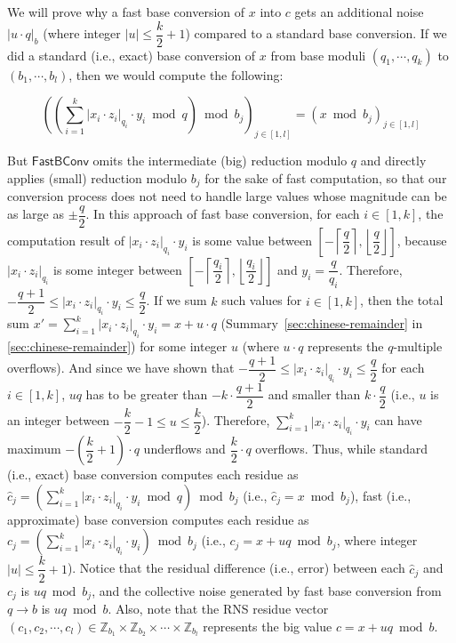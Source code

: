 \begin{myproof}

We will prove why a fast base conversion of $x$ into $c$ gets an additional noise $|u\cdot q|_b$ (where integer $|u| \leq \dfrac{k}{2}+1$) compared to a standard base conversion. If we did a standard (i.e., exact) base conversion of $x$ from base moduli $(q_1, \cdots, q_k)$ to $(b_1, \cdots, b_l)$, then we would compute the following:

$$
\left( \left( \sum\limits_{i=1}^{k} |x_i \cdot z_i|_{q_i} \cdot y_i \bmod q \right) \bmod b_j \right)_{j \in [1,l]} = \left( x \bmod b_j \right)_{j \in [1,l]}
$$

But $\textsf{FastBConv}$ omits the intermediate (big) reduction modulo $q$ and directly applies (small) reduction modulo $b_j$ for the sake of fast computation, so that our conversion process does not need to handle large values whose magnitude can be as large as $\pm\dfrac{q}{2}$. In this approach of fast base conversion, for each $i \in [1, k]$, the computation result of $|x_i \cdot z_i|_{q_i} \cdot y_i$ is some value between $\left[-\left\lceil\dfrac{q}{2}\right\rceil, \left\lfloor\dfrac{q}{2}\right\rfloor\right]$, because $|x_i \cdot z_i|_{q_i}$ is some integer between $\left[-\left\lceil\dfrac{q_i}{2}\right\rceil, \left\lfloor\dfrac{q_i}{2}\right\rfloor\right]$ and $y_i = \dfrac{q}{q_i}$. Therefore, $-\dfrac{q+1}{2} \leq |x_i \cdot z_i|_{q_i} \cdot y_i \leq \dfrac{q}{2}$. If we sum $k$ such values for $i \in [1, k]$, then the total sum $x' = \sum\limits_{i=1}^{k} |x_i \cdot z_i|_{q_i} \cdot y_i = x + u\cdot q$ (Summary~\ref*{sec:chinese-remainder} in \autoref{sec:chinese-remainder}) for some integer $u$ (where $u\cdot q$ represents the $q$-multiple overflows). And since we have shown that $-\dfrac{q+1}{2} \leq |x_i \cdot z_i|_{q_i} \cdot y_i \leq \dfrac{q}{2}$ for each $i \in [1, k]$, $uq$ has to be greater than $-k\cdot\dfrac{q+1}{2}$ and smaller than $k\cdot\dfrac{q}{2}$ (i.e., $u$ is an integer between $-\dfrac{k}{2} - 1 \leq u \leq \dfrac{k}{2}$). Therefore, $\sum\limits_{i=1}^{k} |x_i \cdot z_i|_{q_i} \cdot y_i$ can have maximum $-\left(\dfrac{k}{2} + 1\right)\cdot q$ underflows and $\dfrac{k}{2}\cdot q$ overflows. Thus, while standard (i.e., exact) base conversion computes each residue as $\hat{c}_j = \left(\sum\limits_{i=1}^{k} |x_i \cdot z_i|_{q_i} \cdot y_i \bmod q\right) \bmod b_j$ (i.e., $\hat{c}_j = x \bmod b_j$), fast (i.e., approximate) base conversion computes each residue as $c_j = \left(\sum\limits_{i=1}^{k} |x_i \cdot z_i|_{q_i} \cdot y_i\right) \bmod b_j$ (i.e., $c_j = x + uq \bmod b_j$, where integer $|u| \leq \dfrac{k}{2} + 1$). Notice that the residual difference (i.e., error) between each $\hat{c}_j$ and $c_j$ is $uq \bmod b_j$, and the collective noise generated by fast base conversion from $q \rightarrow  b$ is  $uq \bmod b$. Also, note that the RNS residue vector $(c_1, c_2, \cdots, c_l) \in \mathbb{Z}_{b_1} \times \mathbb{Z}_{b_2} \times \cdots \times \mathbb{Z}_{b_l}$ represents the big value $c = x + uq \bmod b$. 


\end{myproof}
